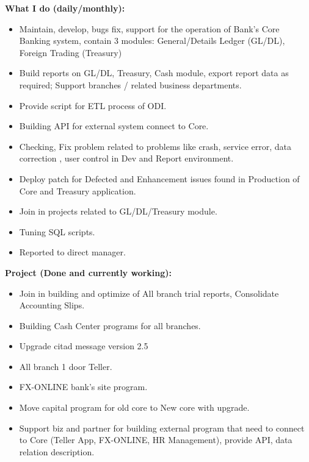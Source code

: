 \documentclass[10pt,a4paper]{altacv}
\begin{document}
\textbf{\color{accent}What I do (daily/monthly):}
\begin{itemize}
\item Maintain, develop, bugs fix, support for the operation of Bank's Core Banking system, contain 3 modules: General/Details Ledger (GL/DL), Foreign Trading (Treasury) 
\item Build reports on GL/DL, Treasury, Cash module, export report data as required; Support branches / related business departments.
\item Provide script for ETL process of ODI.
\item Building API for external system connect to Core.
\item Checking, Fix problem related to problems like crash, service error, data correction , user control in Dev and Report environment.
\item Deploy patch for Defected and Enhancement issues found in Production of Core and Treasury application.
\item Join in projects related to GL/DL/Treasury module.
\item Tuning SQL scripts.
\item Reported to direct manager.
\end{itemize}
\smallskip
\textbf{\color{accent}Project (Done and currently working):}
\begin{itemize}
\item Join in building and optimize of All branch trial reports, Consolidate Accounting Slips.
\item Building Cash Center programs for all branches.
\item Upgrade citad message version 2.5
\item All branch 1 door Teller.
\item FX-ONLINE bank's site program.
\item Move capital program for old core to New core with upgrade.
\item Support biz and partner for building external program that need to connect to Core (Teller App, FX-ONLINE, HR Management), provide API, data relation description.
\end{itemize}
\divider


\end{document}
